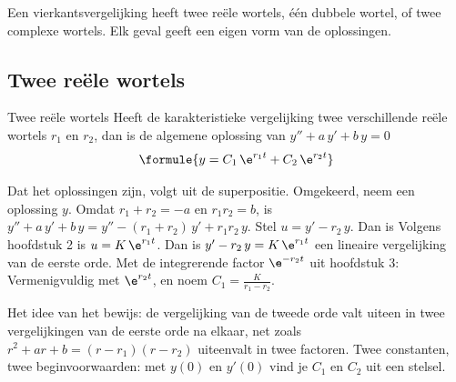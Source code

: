 Een vierkantsvergelijking heeft twee reële wortels, één dubbele wortel, of twee complexe wortels. Elk geval geeft een eigen vorm van de oplossingen.

\subsection{Twee reële wortels}

\begin{theorie}
\begin{stelling}{Twee reële wortels}
Heeft de karakteristieke vergelijking twee verschillende reële wortels $r_1$ en $r_2$, dan is de algemene oplossing van $y'' + a\,y' + b\,y = 0$
\[
\formule{y = C_1\,\e^{r_1 t} + C_2\,\e^{r_2 t}}
\]
\end{stelling}

\begin{bewijs}
Dat het oplossingen zijn, volgt uit de superpositie. Omgekeerd, neem een oplossing $y$. Omdat $r_1 + r_2 = -a$ en $r_1 r_2 = b$, is $y'' + a\,y' + b\,y = y'' - (r_1 + r_2)\,y' + r_1 r_2\,y$. Stel $u = y' - r_2\,y$. Dan is
Volgens hoofdstuk 2 is $u = K\,\e^{r_1 t}$. Dan is $y' - r_2\,y = K\,\e^{r_1 t}$ een lineaire vergelijking van de eerste orde. Met de integrerende factor $\e^{-r_2 t}$ uit hoofdstuk 3:
Vermenigvuldig met $\e^{r_2 t}$, en noem $C_1 = \tfrac{K}{r_1 - r_2}$.
\end{bewijs}
\end{theorie}

Het idee van het bewijs: de vergelijking van de tweede orde valt uiteen in twee vergelijkingen van de eerste orde na elkaar, net zoals $r^2 + ar + b = (r - r_1)(r - r_2)$ uiteenvalt in twee factoren. Twee constanten, twee beginvoorwaarden: met $y(0)$ en $y'(0)$ vind je $C_1$ en $C_2$ uit een stelsel.

